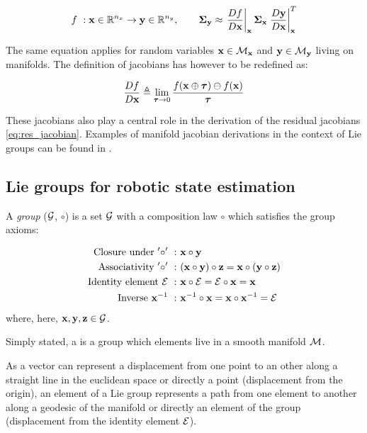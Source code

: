 \begin{equation}
    f~: {\bf x} \in \mathbb{R}^{n_x} \rightarrow {\bf y} \in \mathbb{R}^{n_y}, \quad \quad {\bm \Sigma}_{{\bf y}} \approx 
                \left.\frac{D f}{D {\bf x}} \right|_{{\bf x}}   {\bm \Sigma}_{{\bf x}}    \left.\frac{D {\bf y}}{D {\bf x}}\right|_{{\bf x}}^T
\end{equation}

The same equation applies for random variables ${\bf x} \in \mathcal{M}_{{\bf x}}$ and ${\bf y} \in \mathcal{M}_{{\bf y}}$ living on manifolds. The definition of jacobians has however
to be redefined as:

\begin{equation}
    \frac{D f}{D {\bf x}} \triangleq \lim_{{\bm \tau} \to 0} \frac{f({\bf x} \oplus {\bm \tau}) \ominus f({\bf x})}{{\bm \tau}}
\end{equation}

These jacobians also play a central role in the derivation of the residual jacobians \ref{eq:res_jacobian}.
Examples of manifold jacobian derivations in the context of Lie groups can be found in \cite{sola2018micro}.  



\subsection{Lie groups for robotic state estimation}
A \textit{group} ($\mathcal{G}$, $\circ$) is a set $\mathcal{G}$ with a composition law $\circ$ which satisfies the group axioms:

\begin{align}
    \text{Closure under}~'\circ'~:&~{\bf x} \circ {\bf y} \\ 
    \text{Associativity}~'\circ'~:&~({\bf x} \circ {\bf y}) \circ {\bf z} = {\bf x} \circ ({\bf y} \circ {\bf z}) \\ 
    \text{Identity element}~\mathcal{E}~:&~{\bf x} \circ \mathcal{E} = \mathcal{E} \circ {\bf x} = {\bf x} \\ 
    \text{Inverse}~{\bf x}^{-1}~:&~{\bf x}^{-1} \circ {\bf x} = {\bf x} \circ {\bf x}^{-1} = \mathcal{E}
\end{align}
where, here, ${\bf x},{\bf y},{\bf z} \in \mathcal{G}$.

Simply stated, a  is a group which elements live in a smooth manifold $\mathcal{M}$.

As a vector can represent a displacement from one point to an other along a straight line in the euclidean space or directly a point (displacement from the origin),
an element of a Lie group represents a path from one element to another along a geodesic of the manifold or directly an element of the group 
(displacement from the identity element $\mathcal{E}$).

